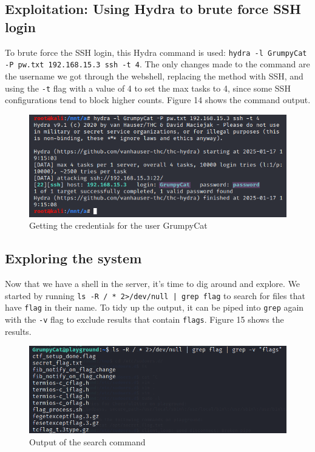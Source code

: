 \documentclass[a4paper]{article}
\newcommand{\abc}{\hfill \break}
\begin{document}
\subsection{Exploitation: Using Hydra to brute force SSH login}
To brute force the SSH login, this Hydra command is used: \abc\texttt{hydra -l GrumpyCat -P pw.txt 192.168.15.3 ssh -t 4}. The only changes made to the command are the username we got through the webshell, replacing the method with SSH, and using the \texttt{-t} flag with a value of 4 to set the max tasks to 4, since some SSH configurations tend to block higher counts. Figure 14 shows the command output. \cite{hydra-ssh}
\begin{figure}[h]
	\includegraphics[scale=0.5]{images/hydrassh.png}
	\centering
	\caption{Getting the credentials for the user GrumpyCat}
\end{figure}\abc
\newpage
\subsection{Exploring the system}
Now that we have a shell in the server, it's time to dig around and explore. We started by running \texttt{ls -R / * 2>/dev/null | grep flag} to search for files that have \texttt{flag} in their name. To tidy up the output, it can be piped into \texttt{grep} again with the \texttt{-v} flag to exclude results that contain \texttt{flags}. Figure 15 shows the results.
\begin{figure}[h]
	\includegraphics[scale=0.5]{images/searchingfor falgfiles.png}
	\centering
	\caption{Output of the search command}
\end{figure}\abc
\end{document}
